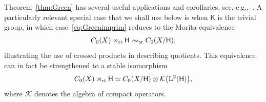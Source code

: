 \documentclass[10pt,a4paper]{amsart}
\numberwithin{equation}{section}
\newcommand{\mbf}[1]{{\boldsymbol {#1} }}
\newcommand{\CK}{\mathcal{K}}
\newcommand{\sfH}{\mathsf{H}}
\newcommand{\sfK}{\mathsf{K}}
\newcommand{\Leb}{{\rm L}}
\newcommand{\rt}{{\rm rt}}
\begin{document}
Theorem~\ref{thm:Green} has several useful applications and
corollaries, see, e.g.,~\cite{Rieffel1976}. A particularly relevant
special case that we shall use below is when $\sfK $ is the trivial group,
in which case~\eqref{eq:Greenimprim} reduces to the Morita equivalence
\begin{gather*}%
C_0(X)\rtimes_\rt \sfH \ \mbf\sim_{\text{\tiny M}} \ C_0(X/\sfH ) ,
\end{gather*}
illustrating the use of crossed products in describing
quotients. This equivalence can in fact be strengthened to a stable
isomorphism~\cite{Rieffel1976}
\begin{gather}\label{eq:XsfHiso}
C_0(X)\rtimes_\rt \sfH \simeq C_0(X/\sfH ) \otimes \CK\big(\Leb^2(\sfH)\big) ,
\end{gather}
where $\CK$ denotes the algebra of
compact operators.
\end{document}
